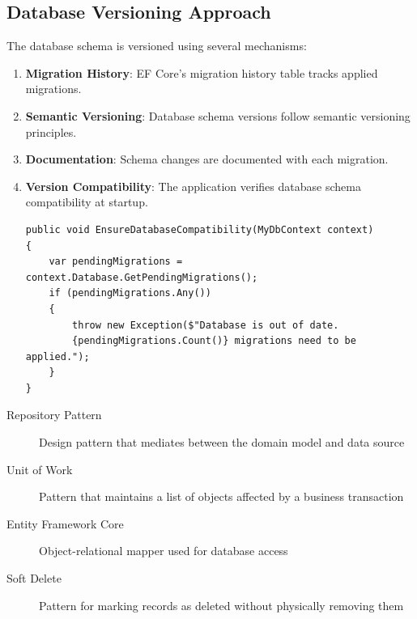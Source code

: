 \subsection{Database Versioning Approach}

The database schema is versioned using several mechanisms:

\begin{enumerate}
   \item \textbf{Migration History}: EF Core's migration history table tracks applied migrations.

   \item \textbf{Semantic Versioning}: Database schema versions follow semantic versioning principles.

   \item \textbf{Documentation}: Schema changes are documented with each migration.

   \item \textbf{Version Compatibility}: The application verifies database schema compatibility at startup.

\begin{verbatim}
public void EnsureDatabaseCompatibility(MyDbContext context)
{
    var pendingMigrations = context.Database.GetPendingMigrations();
    if (pendingMigrations.Any())
    {
        throw new Exception($"Database is out of date.
        {pendingMigrations.Count()} migrations need to be applied.");
    }
}
\end{verbatim}
\end{enumerate}

\begin{terminology}
\begin{description}
    \item[Repository Pattern] Design pattern that mediates between the domain model and data source
    \item[Unit of Work] Pattern that maintains a list of objects affected by a business transaction
    \item[Entity Framework Core] Object-relational mapper used for database access
    \item[Soft Delete] Pattern for marking records as deleted without physically removing them
\end{description}
\end{terminology}






